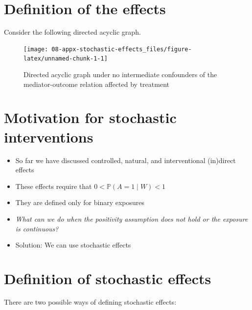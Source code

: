 \documentclass[
  12pt,
]{book}
\providecommand{\tightlist}{%
  \setlength{\itemsep}{0pt}\setlength{\parskip}{0pt}}
\theoremstyle{definition}
\theoremstyle{definition}
\theoremstyle{definition}
\renewcommand{\P}{\mathbb{P}}
\newcommand{\1}{\mathbbm{1}}
\begin{document}
\hypertarget{definition-of-the-effects}{%
\section{Definition of the effects}\label{definition-of-the-effects}}

Consider the following directed acyclic graph.

\begin{figure}

{\centering \texttt{[image: 08-appx-stochastic-effects\_files/figure-latex/unnamed-chunk-1-1]} 

}

\caption{Directed acyclic graph under no intermediate confounders of the mediator-outcome relation affected by treatment}\label{fig:unnamed-chunk-1}
\end{figure}

\hypertarget{motivation-for-stochastic-interventions}{%
\section{Motivation for stochastic interventions}\label{motivation-for-stochastic-interventions}}

\begin{itemize}
\tightlist
\item
  So far we have discussed controlled, natural, and interventional (in)direct effects
\item
  These effects require that \(0 < \P(A=1\mid W) < 1\)
\item
  They are defined only for binary exposures
\item
  \emph{What can we do when the positivity assumption does not hold or the exposure
  is continuous?}
\item
  Solution: We can use stochastic effects
\end{itemize}

\hypertarget{definition-of-stochastic-effects}{%
\section{Definition of stochastic effects}\label{definition-of-stochastic-effects}}

There are two possible ways of defining stochastic effects:
\end{document}
